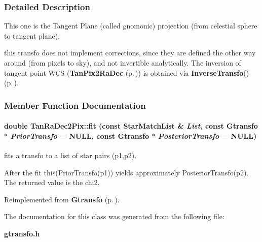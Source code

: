 \subsubsection{Detailed Description}
This one is the Tangent Plane (called gnomonic) projection (from celestial sphere to tangent plane).

this transfo does not implement corrections, since  they are defined the other way around (from pixels to sky),  and not invertible analytically. The inversion of tangent point WCS ({\bf Tan\-Pix2Ra\-Dec} {\rm (p.\,\pageref{class_tanpix2radec})}) is obtained via {\bf Inverse\-Transfo}() {\rm (p.\,\pageref{class_tanradec2pix_a7})}. 



\subsubsection{Member Function Documentation}
\paragraph{\setlength{\rightskip}{0pt plus 5cm}double Tan\-Ra\-Dec2Pix::fit (const Star\-Match\-List \& {\em List}, const {\bf Gtransfo} $\ast$ {\em Prior\-Transfo} = NULL, const {\bf Gtransfo} $\ast$ {\em Posterior\-Transfo} = NULL)\hspace{0.3cm}{\tt  [virtual]}}\hfill\label{class_tanradec2pix_a10}


fits a transfo to a list of star pairs (p1,p2).

After the fit this(Prior\-Transfo(p1)) yields approximately Posterior\-Transfo(p2). The returned value is the chi2. 

Reimplemented from {\bf Gtransfo} {\rm (p.\,\pageref{class_gtransfo_a4})}.

The documentation for this class was generated from the following file:\begin{CompactItemize}
\item 
{\bf gtransfo.h}\end{CompactItemize}
